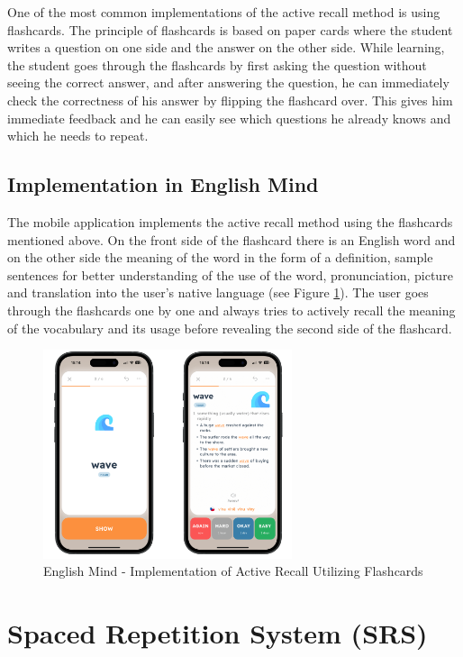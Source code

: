 One of the most common implementations of the active recall method is using flashcards. The principle of flashcards is based on paper cards where the student writes a question on one side and the answer on the other side. While learning, the student goes through the flashcards by first asking the question without seeing the correct answer, and after answering the question, he can immediately check the correctness of his answer by flipping the flashcard over. This gives him immediate feedback and he can easily see which questions he already knows and which he needs to repeat.

\subsection*{Implementation in English Mind} 
\label{sec:em-active-recall-flashcards}

The mobile application implements the active recall method using the flashcards mentioned above. On the front side of the flashcard there is an English word and on the other side the meaning of the word in the form of a definition, sample sentences for better understanding of the use of the word, pronunciation, picture and translation into the user's native language (see Figure \ref{fig:em-flashcards}). The user goes through the flashcards one by one and always tries to actively recall the meaning of the vocabulary and its usage before revealing the second side of the flashcard. 

\begin{figure}[!h]
    \includegraphics[width=0.65\textwidth]{src/figures/em-flashcards.png}
    \caption{English Mind - Implementation of Active Recall Utilizing Flashcards}
    \label{fig:em-flashcards}
\end{figure}

\section{Spaced Repetition System (SRS)}

